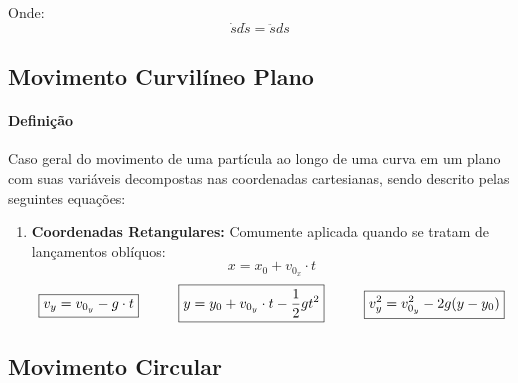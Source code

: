 \documentclass{article}
\begin{document}
            Onde:
                \begin{equation}
                    \boxed{
                        \dot{s} d\dot{s} = \ddot{s} ds
                    }
                \end{equation}

        \subsection{Movimento Curvilíneo Plano}
            \paragraph{Definição}Caso geral do movimento de uma partícula ao longo de uma curva em um plano com suas variáveis decompostas nas coordenadas cartesianas, sendo descrito pelas seguintes equações:
                \begin{enumerate}[noitemsep]
                    \item \textbf{Coordenadas Retangulares:} Comumente aplicada quando se tratam de lançamentos oblíquos:
                        \[
                            \boxed{x = x_{0} + v_{0_{x}} \cdot t}
                        \]
                        \[
                            \boxed{v_{y} = v_{0_{y}} - g \cdot t}
                            \hspace{10mm}
                            \boxed{y = y_{0} + v_{0_{y}} \cdot t - \frac{1}{2}g t^{2}}
                            \hspace{10mm}
                            \boxed{v_{y}^{2} = v_{0_{y}}^{2} - 2g(y - y_{0})}
                        \]
                \end{enumerate}

        \subsection{Movimento Circular}
\end{document}
